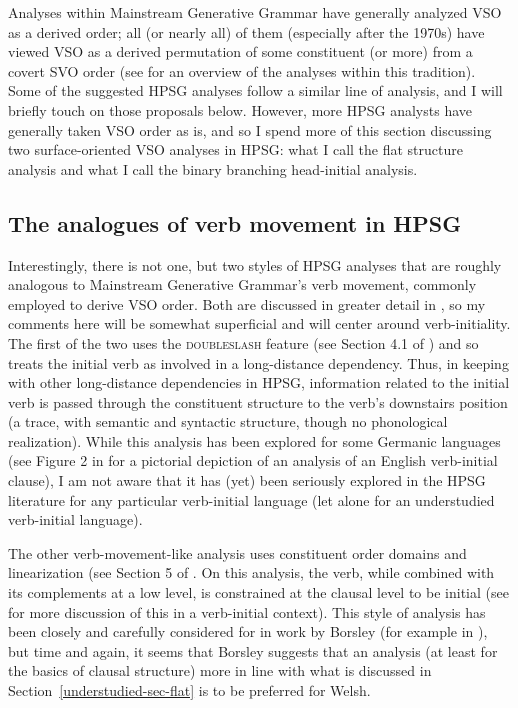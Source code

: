 \documentclass[output=paper
	        ,collection
	        ,collectionchapter
 	        ,biblatex
                ,babelshorthands
                ,newtxmath
                ,draftmode
                ,colorlinks, citecolor=brown
]{langscibook}
\begin{document}
Analyses within Mainstream Generative Grammar have generally analyzed VSO as a derived order; all (or nearly all) of them (especially after the 1970s) have viewed VSO as a derived permutation of some constituent (or more) from a covert SVO order (see \citealt{clemenspolinsky17} for an overview of the analyses within this tradition). Some of the suggested HPSG analyses follow a similar line of analysis, and I will briefly touch on those proposals below. However, more HPSG analysts have generally taken VSO order as is, and so I spend more of this section discussing two surface-oriented VSO analyses in HPSG: what I call the flat structure analysis and what I call the binary branching head-initial analysis.  

\subsection{The analogues of verb movement in HPSG}

Interestingly, there is not one, but two styles of HPSG analyses that are roughly analogous to Mainstream Generative Grammar's verb movement, commonly employed to derive VSO order. Both are discussed in greater detail in , so my comments here will be somewhat superficial and will center around verb-initiality. The first of the two uses the \textsc{doubleslash} feature (see Section 4.1 of ) and so treats the initial verb as involved in a long-distance dependency. Thus, in keeping with other long-distance dependencies in HPSG, information related to the initial verb is passed through the constituent structure to the verb's downstairs position (a trace, with semantic and syntactic structure, though no phonological realization). While this analysis has been explored for some Germanic languages (see Figure 2 in  for a pictorial depiction of an analysis of an English verb-initial clause), I am not aware that it has (yet) been seriously explored in the HPSG literature for any particular verb-initial language (let alone for an understudied verb-initial language).  

The other verb-movement-like analysis uses constituent order domains and linearization (see Section 5 of . On this analysis, the verb, while combined with its complements at a low level, is constrained at the clausal level to be initial (see \citealt{borsley06} for more discussion of this in a verb-initial context). This style of analysis has been closely and carefully considered for  in work by Borsley (for example in \citealt{Borsley89b,borsley95,Borsley2009a-u}), but time and again, it seems that Borsley suggests that an analysis (at least for the basics of clausal structure) more in line with what is discussed in Section~\ref{understudied-sec-flat} is to be preferred for Welsh.   
\end{document}
